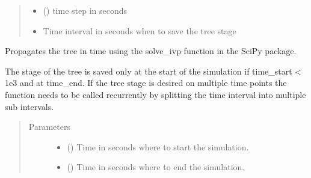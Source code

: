 \documentclass[letterpaper,10pt,english]{sphinxmanual}
\begin{document}
\begin{fulllineitems}
\begin{fulllineitems}
\begin{quote}
\begin{description}
\begin{itemize}
\item {} 
 () \textendash{} time step in seconds

\item {} 
 \textendash{} Time interval in seconds when to save the tree stage

\end{itemize}

\end{description}\end{quote}

\end{fulllineitems}


\begin{fulllineitems}
\label{\detokenize{index:src.model.Model.run_scipy}}
Propagates the tree in time using the solve\_ivp function in the SciPy package.

The stage of the tree is saved only at the start of the simulation if time\_start \textless{} 1e\sphinxhyphen{}3 and at time\_end.
If the tree stage is desired on multiple time points the function needs to be called recurrently by splitting
the time interval into multiple sub intervals.
\begin{quote}\begin{description}
\item[{Parameters}] \leavevmode\begin{itemize}
\item {} 
 () \textendash{} Time in seconds where to start the simulation.

\item {} 
 () \textendash{} Time in seconds where to end the simulation.


\end{itemize}
\end{description}
\end{quote}
\end{fulllineitems}
\end{fulllineitems}
\end{document}
